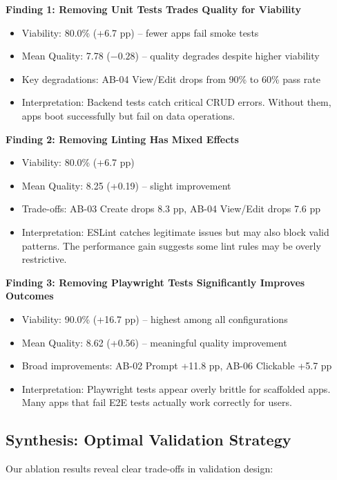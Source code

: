 \documentclass[conference]{IEEEtran}
\begin{document}
\textbf{Finding 1: Removing Unit Tests Trades Quality for Viability}
\begin{itemize}
\item Viability: 80.0\% (+6.7 pp) -- fewer apps fail smoke tests
\item Mean Quality: 7.78 ($-0.28$) -- quality degrades despite higher viability
\item Key degradations: AB-04 View/Edit drops from 90\% to 60\% pass rate
\item Interpretation: Backend tests catch critical CRUD errors. Without them, apps boot successfully but fail on data operations.
\end{itemize}

\textbf{Finding 2: Removing Linting Has Mixed Effects}
\begin{itemize}
\item Viability: 80.0\% (+6.7 pp)
\item Mean Quality: 8.25 (+0.19) -- slight improvement
\item Trade-offs: AB-03 Create drops 8.3 pp, AB-04 View/Edit drops 7.6 pp
\item Interpretation: ESLint catches legitimate issues but may also block valid patterns. The performance gain suggests some lint rules may be overly restrictive.
\end{itemize}

\textbf{Finding 3: Removing Playwright Tests Significantly Improves Outcomes}
\begin{itemize}
\item Viability: 90.0\% (+16.7 pp) -- highest among all configurations
\item Mean Quality: 8.62 (+0.56) -- meaningful quality improvement
\item Broad improvements: AB-02 Prompt +11.8 pp, AB-06 Clickable +5.7 pp
\item Interpretation: Playwright tests appear overly brittle for scaffolded apps. Many apps that fail E2E tests actually work correctly for users.
\end{itemize}

\subsection{Synthesis: Optimal Validation Strategy}

Our ablation results reveal clear trade-offs in validation design:
\end{document}
